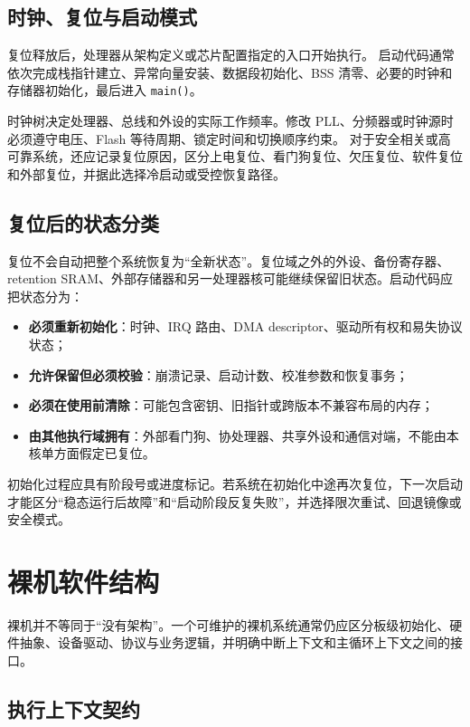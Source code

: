 \subsection{时钟、复位与启动模式}

复位释放后，处理器从架构定义或芯片配置指定的入口开始执行。
启动代码通常依次完成栈指针建立、异常向量安装、数据段初始化、BSS 清零、必要的时钟和存储器初始化，最后进入 \texttt{main()}。

时钟树决定处理器、总线和外设的实际工作频率。修改 PLL、分频器或时钟源时必须遵守电压、Flash 等待周期、锁定时间和切换顺序约束。
对于安全相关或高可靠系统，还应记录复位原因，区分上电复位、看门狗复位、欠压复位、软件复位和外部复位，并据此选择冷启动或受控恢复路径。

\subsection{复位后的状态分类}

复位不会自动把整个系统恢复为“全新状态”。复位域之外的外设、备份寄存器、retention SRAM、外部存储器和另一处理器核可能继续保留旧状态。启动代码应把状态分为：
\begin{itemize}
  \item \textbf{必须重新初始化}：时钟、IRQ 路由、DMA descriptor、驱动所有权和易失协议状态；
  \item \textbf{允许保留但必须校验}：崩溃记录、启动计数、校准参数和恢复事务；
  \item \textbf{必须在使用前清除}：可能包含密钥、旧指针或跨版本不兼容布局的内存；
  \item \textbf{由其他执行域拥有}：外部看门狗、协处理器、共享外设和通信对端，不能由本核单方面假定已复位。
\end{itemize}

初始化过程应具有阶段号或进度标记。若系统在初始化中途再次复位，下一次启动才能区分“稳态运行后故障”和“启动阶段反复失败”，并选择限次重试、回退镜像或安全模式。

\section{裸机软件结构}

裸机并不等同于“没有架构”。一个可维护的裸机系统通常仍应区分板级初始化、硬件抽象、设备驱动、协议与业务逻辑，并明确中断上下文和主循环上下文之间的接口。

\subsection{执行上下文契约}

